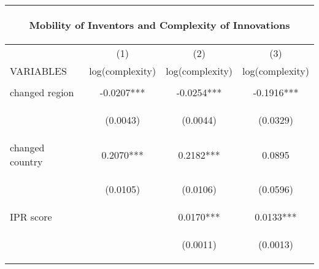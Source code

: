 \begin{center}
\begin{tabular}{lccc}
\multicolumn{4}{c}{\begin{large}Mobility of Inventors and Complexity of Innovations\end{large}} \\ \hline
 & (1) & (2) & (3) \\
VARIABLES & log(complexity) & log(complexity) & log(complexity) \\ \hline
\vspace{4pt} & \begin{footnotesize}\end{footnotesize} & \begin{footnotesize}\end{footnotesize} & \begin{footnotesize}\end{footnotesize} \\
changed region & -0.0207*** & -0.0254*** & -0.1916*** \\
\vspace{4pt} & \begin{footnotesize}(0.0043)\end{footnotesize} & \begin{footnotesize}(0.0044)\end{footnotesize} & \begin{footnotesize}(0.0329)\end{footnotesize} \\
changed country & 0.2070*** & 0.2182*** & 0.0895 \\
\vspace{4pt} & \begin{footnotesize}(0.0105)\end{footnotesize} & \begin{footnotesize}(0.0106)\end{footnotesize} & \begin{footnotesize}(0.0596)\end{footnotesize} \\
IPR score &  & 0.0170*** & 0.0133*** \\
\vspace{4pt} & \begin{footnotesize}\end{footnotesize} & \begin{footnotesize}(0.0011)\end{footnotesize} & \begin{footnotesize}(0.0013)\end{footnotesize} \\

\end{tabular}
\end{center}
